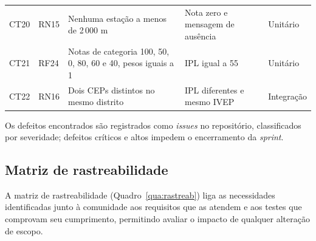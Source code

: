 \begin{longtable}{C{1.1cm}C{1.8cm}L{4.6cm}L{4.4cm}C{1.8cm}}
	CT20        & RN15               & Nenhuma estação a menos de 2\,000 m                          & Nota zero e mensagem de ausência                                           & Unitário       \\
	CT21        & RF24               & Notas de categoria 100, 50, 0, 80, 60 e 40, pesos iguais a 1 & IPL igual a 55                                                             & Unitário       \\
	CT22        & RN16               & Dois CEPs distintos no mesmo distrito                        & IPL diferentes e mesmo IVEP                                                & Integração     \\
\end{longtable}
\vspace{-0.4cm}

Os defeitos encontrados são registrados como \emph{issues} no repositório, classificados por severidade; defeitos críticos e altos impedem o encerramento da \emph{sprint}.

\subsection{Matriz de rastreabilidade}

A matriz de rastreabilidade (Quadro~\ref{qua:rastreab}) liga as necessidades identificadas junto à comunidade aos requisitos que as atendem e aos testes que comprovam seu cumprimento, permitindo avaliar o impacto de qualquer alteração de escopo.

